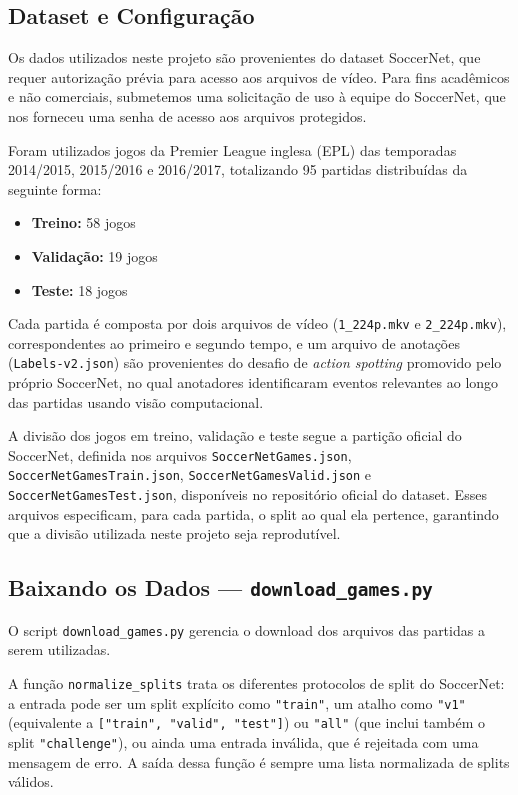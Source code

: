 \documentclass[12pt, a4paper]{article}
\begin{document}
\subsection{Dataset e Configuração}

Os dados utilizados neste projeto são provenientes do dataset SoccerNet, que requer autorização prévia para acesso aos arquivos de vídeo. Para fins acadêmicos e não comerciais, submetemos uma solicitação de uso à equipe do SoccerNet, que nos forneceu uma senha de acesso aos arquivos protegidos.

Foram utilizados jogos da Premier League inglesa (EPL) das temporadas 2014/2015, 2015/2016 e 2016/2017, totalizando 95 partidas distribuídas da seguinte forma:


\begin{itemize}
    \item \textbf{Treino:} 58 jogos
    \item \textbf{Validação:} 19 jogos
    \item \textbf{Teste:} 18 jogos
\end{itemize}

Cada partida é composta por dois arquivos de vídeo (\texttt{1\_224p.mkv} e \texttt{2\_224p.mkv}), correspondentes ao primeiro e segundo tempo, e um arquivo de anotações (\texttt{Labels-v2.json}) são provenientes do desafio de \textit{action spotting} promovido pelo próprio SoccerNet, no qual anotadores identificaram eventos relevantes ao longo das partidas usando visão computacional.

A divisão dos jogos em treino, validação e teste segue a partição oficial do SoccerNet, definida nos arquivos \texttt{SoccerNetGames.json}, \texttt{SoccerNetGamesTrain.json}, \texttt{SoccerNetGamesValid.json} e \texttt{SoccerNetGamesTest.json}, disponíveis no repositório oficial do dataset. Esses arquivos especificam, para cada partida, o split ao qual ela pertence, garantindo que a divisão utilizada neste projeto seja reprodutível.
\subsection{Baixando os Dados — \texttt{download\_games.py}}

O script \texttt{download\_games.py} gerencia o download dos arquivos das partidas a serem utilizadas. 

A função \texttt{normalize\_splits} trata os diferentes protocolos de split do SoccerNet: a entrada pode ser um split explícito como \texttt{"train"}, um atalho como \texttt{"v1"} (equivalente a \texttt{["train", "valid", "test"]}) ou \texttt{"all"} (que inclui também o split \texttt{"challenge"}), ou ainda uma entrada inválida, que é rejeitada com uma mensagem de erro. A saída dessa função é sempre uma lista normalizada de splits válidos.
\end{document}

